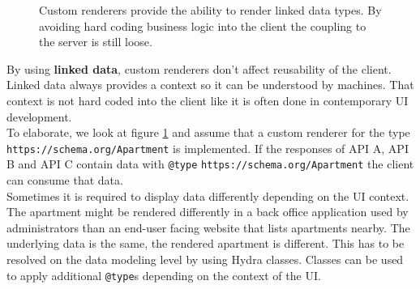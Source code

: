 \begin{figure}[!htb]
  \caption{Custom renderers provide the ability to render linked data types. By avoiding hard coding business logic into the client the coupling to the server is still loose.}
  \label{fig:linkeddata}
\end{figure}

By using \textbf{linked data}, custom renderers don't affect reusability of the client. Linked data always provides a context so it can be understood by machines. That context is not hard coded into the client like it is often done in contemporary UI development. \\
To elaborate, we look at figure \ref{fig:linkeddata} and assume that a custom renderer for the type \lstinline{https://schema.org/Apartment} is implemented. If the responses of API A, API B and API C contain data with \lstinline{@type} \lstinline{https://schema.org/Apartment} the client can consume that data. \\
Sometimes it is required to display data differently depending on the UI context. The apartment might be rendered differently in a back office application used by administrators than an end-user facing website that lists apartments nearby. The underlying data is the same, the rendered apartment is different. This has to be resolved on the data modeling level by using Hydra classes. Classes can be used to apply additional \lstinline{@type}s depending on the context of the UI.
